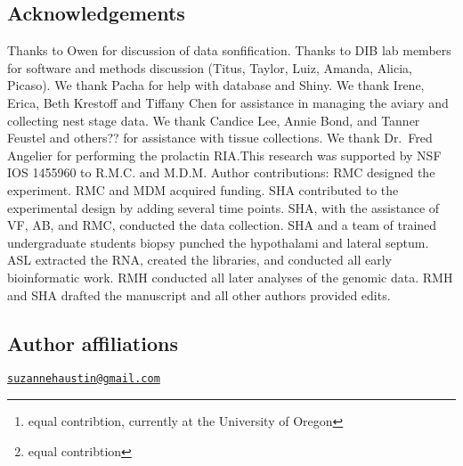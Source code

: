 

\hypertarget{acknowledgements}{%
\subsection{Acknowledgements}\label{acknowledgements}}

Thanks to Owen for discussion of data sonfification. Thanks to DIB lab
members for software and methods discussion (Titus, Taylor, Luiz,
Amanda, Alicia, Picaso). We thank Pacha for help with database and
Shiny. We thank Irene, Erica, Beth Krestoff and Tiffany Chen for
assistance in managing the aviary and collecting nest stage data. We
thank Candice Lee, Annie Bond, and Tanner Feustel and others?? for
assistance with tissue collections. We thank Dr.~Fred Angelier for
performing the prolactin RIA.This research was supported by NSF IOS
1455960 to R.M.C. and M.D.M. Author contributions: RMC designed the
experiment. RMC and MDM acquired funding. SHA contributed to the
experimental design by adding several time points. SHA, with the
assistance of VF, AB, and RMC, conducted the data collection. SHA and a
team of trained undergraduate students biopsy punched the hypothalami
and lateral septum. ASL extracted the RNA, created the libraries, and
conducted all early bioinformatic work. RMH conducted all later analyses
of the genomic data. RMH and SHA drafted the manuscript and all other
authors provided edits.

\hypertarget{author-affiliations}{%
\subsection{Author affiliations}\label{author-affiliations}}


\address{%
Suzanne H. Austin \footnote{equal contribtion, currently at the
  University of Oregon}\\
University of California, Davis\\
\\
}
\href{mailto:suzannehaustin@gmail.com}{\nolinkurl{suzannehaustin@gmail.com}}

\address{%
Rayna M Harris \footnote{equal contribtion}\\
University of California, Davis\\
\\
}


\address{%
Andrew S. Lang\\
University of New Hampshire\\
\\
}


